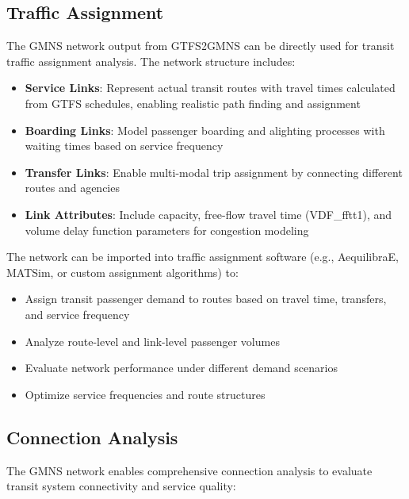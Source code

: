 \documentclass[11pt,a4paper]{article}
\begin{document}
\subsection{Traffic Assignment}

The GMNS network output from GTFS2GMNS can be directly used for transit traffic assignment analysis. The network structure includes:

\begin{itemize}
    \item \textbf{Service Links}: Represent actual transit routes with travel times calculated from GTFS schedules, enabling realistic path finding and assignment
    \item \textbf{Boarding Links}: Model passenger boarding and alighting processes with waiting times based on service frequency
    \item \textbf{Transfer Links}: Enable multi-modal trip assignment by connecting different routes and agencies
    \item \textbf{Link Attributes}: Include capacity, free-flow travel time (VDF\_fftt1), and volume delay function parameters for congestion modeling
\end{itemize}

The network can be imported into traffic assignment software (e.g., AequilibraE, MATSim, or custom assignment algorithms) to:
\begin{itemize}
    \item Assign transit passenger demand to routes based on travel time, transfers, and service frequency
    \item Analyze route-level and link-level passenger volumes
    \item Evaluate network performance under different demand scenarios
    \item Optimize service frequencies and route structures
\end{itemize}

\subsection{Connection Analysis}

The GMNS network enables comprehensive connection analysis to evaluate transit system connectivity and service quality:
\end{document}

